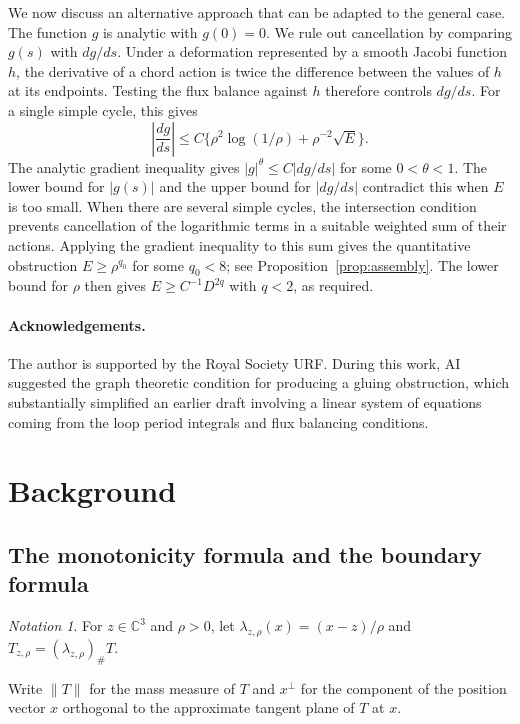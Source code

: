 \documentclass[11pt,a4paper]{article}
\numberwithin{equation}{section}
\theoremstyle{definition}
\theoremstyle{remark}
\newtheorem*{notation}{Notation}
\newcommand{\C}{\mathbb C}
\begin{document}
	We now discuss an alternative approach that can be adapted to the general
	case. The function $g$ is analytic with $g(0)=0$. We rule out cancellation
	by comparing $g(s)$ with $dg/ds$.
	Under a deformation represented
	by a smooth Jacobi function $h$, the derivative of a chord action is
	twice the difference between the values of $h$ at its endpoints. Testing the flux balance
	against $h$ therefore controls $dg/ds$.
	For a single simple cycle, this gives
	\[
	\left|\frac{dg}{ds}\right|
	\le C\{\rho^2\log(1/\rho)+\rho^{-2}\sqrt E\}.
	\]
	The analytic gradient inequality gives
	$|g|^\theta\le C|dg/ds|$ for some $0<\theta<1$. The lower bound for
	$|g(s)|$ and the upper bound for $|dg/ds|$ contradict this when $E$
	is too small. When there are several simple cycles,
	the intersection condition prevents cancellation of the logarithmic
	terms in a suitable weighted sum of their actions. Applying the
	gradient inequality to this sum gives the quantitative obstruction
	$E\ge\rho^{q_0}$ for some $q_0<8$; see Proposition~\ref{prop:assembly}.
	The lower bound for $\rho$ then gives
	$E\ge C^{-1}D^{2q}$ with $q<2$, as required.
	
	\paragraph{Acknowledgements.}
	The author is supported by the Royal Society URF.
	During this work, AI suggested the graph theoretic condition for producing
	a gluing obstruction, which substantially simplified an earlier draft involving a linear system
	of equations coming from the loop period integrals and flux balancing
	conditions.
	
	
	\section{Background}\label{sect:background}
	
	\subsection{The monotonicity formula and the boundary formula}
	
	\begin{notation}
		For $z\in\C^3$ and $\rho>0$, let
		$\lambda_{z,\rho}(x)=(x-z)/\rho$ and
		$T_{z,\rho}=(\lambda_{z,\rho})_\#T$.
	\end{notation}
	
	Write $\|T\|$ for the mass measure of $T$ and $x^\perp$ for the
	component of the position vector $x$ orthogonal to the approximate
	tangent plane of $T$ at $x$.
	
\end{document}
